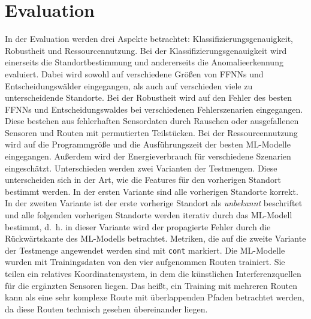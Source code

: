 \chapter{Evaluation}
In der Evaluation werden drei Aspekte betrachtet: Klassifizierungsgenauigkeit, Robustheit und Ressourcennutzung.
Bei der Klassifizierungsgenauigkeit wird einerseits die Standortbestimmung und andererseits die Anomalieerkennung evaluiert.
Dabei wird sowohl auf verschiedene Größen von FFNNs und Entscheidungswälder eingegangen,
als auch auf verschieden viele zu unterscheidende Standorte.
\newline
\newline
Bei der Robustheit wird auf den Fehler des besten FFNNs und Entscheidungswaldes bei verschiedenen Fehlerszenarien eingegangen.
Diese bestehen aus fehlerhaften Sensordaten durch Rauschen oder ausgefallenen Sensoren und Routen mit permutierten Teilstücken.
\newline
\newline
Bei der Ressourcennutzung wird auf die Programmgröße und die Ausführungszeit der besten ML-Modelle eingegangen.
Außerdem wird der Energieverbrauch für verschiedene Szenarien eingeschätzt.
\newline
\newline
Unterschieden werden zwei Varianten der Testmengen.
Diese unterscheiden sich in der Art, wie die Features für den vorherigen Standort bestimmt werden.
In der ersten Variante sind alle vorherigen Standorte korrekt.
In der zweiten Variante ist der erste vorherige Standort als \textit{unbekannt} beschriftet und alle folgenden vorherigen Standorte werden iterativ durch das ML-Modell bestimmt,
d.~h. in dieser Variante wird der propagierte Fehler durch die Rückwärtskante des ML-Modells betrachtet.
Metriken, die auf die zweite Variante der Testmenge angewendet werden sind mit \texttt{cont} markiert.
\newline
\newline
Die ML-Modelle wurden mit Trainingsdaten von den vier aufgenommen Routen trainiert.
Sie teilen ein relatives Koordinatensystem, in dem die künstlichen Interferenzquellen für die ergänzten Sensoren liegen.
Das heißt, ein Training mit mehreren Routen kann als eine sehr komplexe Route mit überlappenden Pfaden betrachtet werden,
da diese Routen technisch gesehen übereinander liegen.










